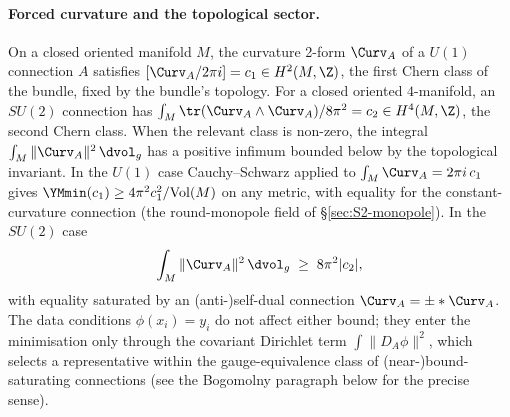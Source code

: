 \paragraph{Forced curvature and the topological sector.} On a closed
oriented manifold $M$, the curvature 2-form $\Curv_A$ of a $U(1)$
connection $A$ satisfies $[\Curv_A/2\pi i]=c_1\in H^2(M,\Z)$, the
first Chern class of the bundle, fixed by the bundle's topology. For
a closed oriented $4$-manifold, an $SU(2)$ connection has $\int_M
\tr(\Curv_A\wedge\Curv_A)/8\pi^2=c_2\in H^4(M,\Z)$, the second Chern
class. When the relevant class is non-zero, the integral
$\int_M\|\Curv_A\|^2\,\dvol_g$ has a positive infimum bounded below
by the topological invariant. In the $U(1)$ case Cauchy--Schwarz
applied to $\int_M\Curv_A=2\pi i\,c_1$ gives
$\YMmin(c_1)\geq 4\pi^2 c_1^2/\mathrm{Vol}(M)$ on any metric, with
equality for the constant-curvature connection (the round-monopole
field of \S\ref{sec:S2-monopole}). In the $SU(2)$ case
\[
   \int_M \|\Curv_A\|^2\,\dvol_g \;\geq\; 8\pi^2|c_2|,
\]
with equality saturated by an (anti-)self-dual connection
$\Curv_A=\pm*\Curv_A$. The data conditions $\phi(x_i)=y_i$ do not
affect either bound; they enter the minimisation only through the
covariant Dirichlet term $\int\|D_A\phi\|^2$, which selects a
representative within the gauge-equivalence class of (near-)bound-saturating
connections (see the Bogomolny paragraph below for the precise
sense).

